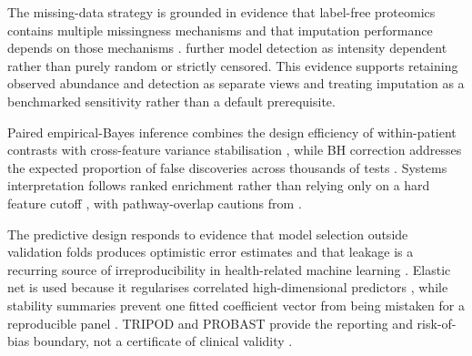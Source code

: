 The missing-data strategy is grounded in evidence that label-free proteomics contains multiple missingness mechanisms and that imputation performance depends on those mechanisms \parencite{webb2015,lazar2016,obrien2018,chion2022}. \textcite{li2023} further model detection as intensity dependent rather than purely random or strictly censored. This evidence supports retaining observed abundance and detection as separate views and treating imputation as a benchmarked sensitivity rather than a default prerequisite.

Paired empirical-Bayes inference combines the design efficiency of within-patient contrasts with cross-feature variance stabilisation \parencite{smyth2004,ritchie2015}, while BH correction addresses the expected proportion of false discoveries across thousands of tests \parencite{benjamini1995}. Systems interpretation follows ranked enrichment rather than relying only on a hard feature cutoff \parencite{subramanian2005}, with pathway-overlap cautions from \textcite{khatri2012}.

The predictive design responds to evidence that model selection outside validation folds produces optimistic error estimates \parencite{varma2006} and that leakage is a recurring source of irreproducibility in health-related machine learning \parencite{davis2023,kapoor2023}. Elastic net is used because it regularises correlated high-dimensional predictors \parencite{zou2005}, while stability summaries prevent one fitted coefficient vector from being mistaken for a reproducible panel \parencite{meinshausen2010}. TRIPOD and PROBAST provide the reporting and risk-of-bias boundary, not a certificate of clinical validity \parencite{collins2015,wolff2019}.
